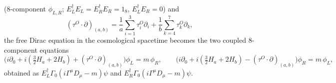 \documentclass[10pt,a4paper]{article}
\begin{document}
(8-component $\phi_{L,R}$; $E_L^\dagger E_L=E_R^\dagger E_R=1_8$, $E_L^\dagger E_R=0$) and
\begin{equation*}
(\tau^O\!\cdot\partial)_{(a,b)}=\frac1a\sum_{i=1}^{3}\tau^O_i\partial_i+\frac1b\sum_{k=4}^{7}\tau^O_k\partial_k,
\end{equation*}
the free Dirac equation in the cosmological spacetime becomes the two coupled 8-component equations
\begin{equation*}
\big(i\partial_0+i(\tfrac32H_a+2H_b)+(\tau^O\!\cdot\partial)_{(a,b)}\big)\phi_L=m\,\phi_R,\qquad \big(i\partial_0+i(\tfrac32H_a+2H_b)-(\tau^O\!\cdot\partial)_{(a,b)}\big)\phi_R=m\,\phi_L,
\end{equation*}
obtained as $E_{L}^\dagger\Gamma_0(i\Gamma^\mu D_\mu-m)\psi$ and $E_{R}^\dagger\Gamma_0(i\Gamma^\mu D_\mu-m)\psi$.
\end{document}
